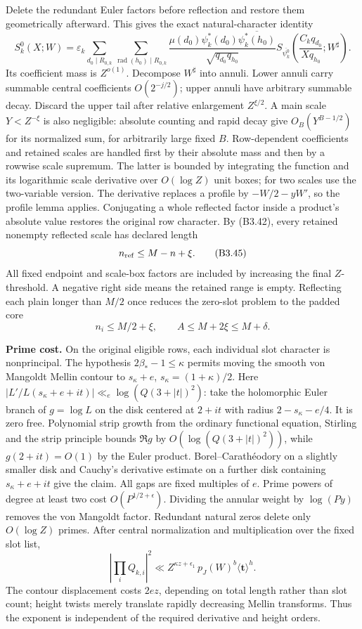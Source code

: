 \documentclass[11pt,a4paper]{article}
\begin{document}
Delete the redundant Euler factors before reflection and restore them
geometrically afterward. This gives the exact natural-character identity
\[
S_k^0(X;W)=\varepsilon_k
 \sum_{d_0\mid R_{0,k}}\sum_{\operatorname{rad}(h_0)\mid R_{0,k}}
 \frac{\mu(d_0)\psi_k^*(d_0)\overline{\psi_k^*(h_0)}}{\sqrt{q_{d_0}q_{h_0}}}
 S_{\overline{\psi_k^0}}\!\left(\frac{C_kq_{d_0}}{Xq_{h_0}};W^\sharp\right).
\tag{B3.44}
\] Its coefficient mass is \(Z^{o(1)}\). Decompose \(W^\sharp\) into
annuli. Lower annuli carry summable central coefficients
\(O(2^{-j/2})\); upper annuli have arbitrary summable decay. Discard the
upper tail after relative enlargement \(Z^{\xi/2}\). A main scale
\(Y<Z^{-\xi}\) is also negligible: absolute counting and rapid decay
give \(O_B(Y^{B-1/2})\) for its normalized sum, for arbitrarily large
fixed \(B\). Row-dependent coefficients and retained scales are handled
first by their absolute mass and then by a rowwise scale supremum. The
latter is bounded by integrating the function and its logarithmic scale
derivative over \(O(\log Z)\) unit boxes; for two scales use the
two-variable version. The derivative replaces a profile by \(-W/2-yW'\),
so the profile lemma applies. Conjugating a whole reflected factor
inside a product's absolute value restores the original row character.
By (B3.42), every retained nonempty reflected scale has declared length
\[
n_{\rm ref}\le M-n+\xi.
\tag{B3.45}
\] All fixed endpoint and scale-box factors are included by increasing
the final \(Z\)-threshold. A negative right side means the retained
range is empty. Reflecting each plain longer than \(M/2\) once reduces
the zero-slot problem to the padded core \[
n_i\le M/2+\xi,\qquad A\le M+2\xi\le M+\delta.
\tag{B3.46}
\]

\textbf{Prime cost.} On the original eligible rows, each individual slot
character is nonprincipal. The hypothesis \(2\beta_*-1\le\kappa\)
permits moving the smooth von Mangoldt Mellin contour to \(s_\kappa+e\),
\(s_\kappa=(1+\kappa)/2\). Here
\(|L'/L(s_\kappa+e+it)|\ll_e\log(Q(3+|t|)^2)\): take the holomorphic
Euler branch of \(g=\log L\) on the disk centered at \(2+it\) with
radius \(2-s_\kappa-e/4\). It is zero free. Polynomial strip growth from
the ordinary functional equation, Stirling and the strip principle
bounds \(\Re g\) by \(O(\log(Q(3+|t|)^2))\), while \(g(2+it)=O(1)\) by
the Euler product. Borel--Carathéodory on a slightly smaller disk and
Cauchy's derivative estimate on a further disk containing
\(s_\kappa+e+it\) give the claim. All gaps are fixed multiples of \(e\).
Prime powers of degree at least two cost \(O(P^{1/2+\epsilon})\).
Dividing the annular weight by \(\log(Py)\) removes the von Mangoldt
factor. Redundant natural zeros delete only \(O(\log Z)\) primes. After
central normalization and multiplication over the fixed slot list, \[
\left|\prod_iQ_{k,i}\right|^2
 \ll Z^{\kappa z+\epsilon_1}\,p_J(W)^b\langle\mathbf t\rangle^h.
\tag{B3.47}
\] The contour displacement costs \(2ez\), depending on total length
rather than slot count; height twists merely translate rapidly
decreasing Mellin transforms. Thus the exponent is independent of the
required derivative and height orders.
\end{document}
